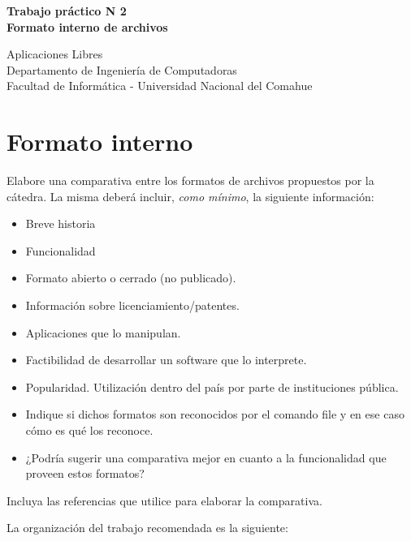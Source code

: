 \documentclass[12pt]{article}
\def\maketitle{

 \makeatletter
 {\color{bl} \centering \huge \sc \textbf{
Trabajo práctico N 2 \\
\large \vspace*{-8pt} \color{black} Formato interno de archivos
 \vspace*{8pt} }\par}
 \makeatother


 \makeatletter
 {\centering \small 
	Aplicaciones Libres\\
 	Departamento de Ingeniería de Computadoras \\
 	Facultad de Informática - Universidad Nacional del Comahue \\
 	\vspace{20pt} }
 \makeatother

}
\begin{document}
\thispagestyle{empty}
\maketitle
\setlength{\parindent}{0pt}

\section*{Formato interno}

Elabore una comparativa entre los formatos de archivos propuestos por la 
cátedra. La misma deberá incluir, {\it como mínimo}, la siguiente información:
\begin{itemize} 
\item Breve historia
\item Funcionalidad
\item Formato abierto o cerrado (no publicado).
\item Información sobre licenciamiento/patentes.
\item Aplicaciones que lo manipulan. 
\item Factibilidad de desarrollar un software que lo interprete. 
\item Popularidad. Utilización dentro del país por parte de instituciones pública.  
\item Indique si dichos formatos son reconocidos por el comando file y en 
ese caso cómo es qué los reconoce.   
\item ¿Podría sugerir una comparativa mejor en cuanto a la funcionalidad que proveen estos formatos?
\end{itemize} 

Incluya las referencias que utilice para elaborar la comparativa. 

La organización del trabajo recomendada es la siguiente:
\end{document}
